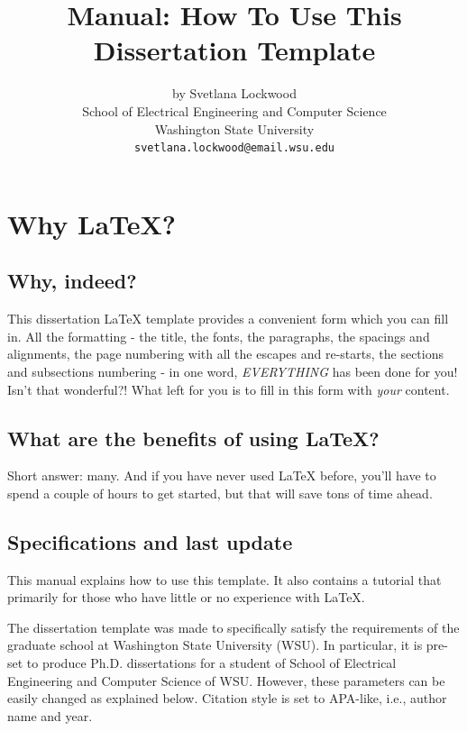 \documentclass{article}
\begin{document}
\title{Manual: How To Use This Dissertation Template}
\author{by Svetlana Lockwood\\
  School of Electrical Engineering and Computer Science\\
  Washington State University\\
  \texttt{svetlana.lockwood@email.wsu.edu}}
\maketitle

\section{Why LaTeX{}?}\label{sl:why}
\subsection{Why, indeed?}
This dissertation LaTeX{} template provides a convenient form which you can fill in. All the formatting - the title, the fonts, the paragraphs, the spacings and alignments, the page numbering with all the escapes and re-starts, the sections and subsections numbering - in one word, {\em \uppercase{everything}} has been done for you! Isn't that wonderful?! What left for you is to fill in this form with {\em your} content.
\subsection{What are the benefits of using LaTeX{}?}\label{latex_benefit}
Short answer: many. And if you have never used LaTeX{} before, you'll have to spend a couple of hours to get started, but that will save tons of time ahead. 
\subsection{Specifications and last update}\label{last_update}
This manual explains how to use this template. It also contains a tutorial that primarily for those who have little or no experience with LaTeX{}. 

The dissertation template was made to specifically satisfy the requirements of the graduate school at Washington State University (WSU). In particular, it is pre-set to produce Ph.D. dissertations for a student of School of Electrical Engineering and Computer Science of WSU. However, these parameters can be easily changed as explained below. Citation style is set to APA-like, i.e., author name and year.
\end{document}

